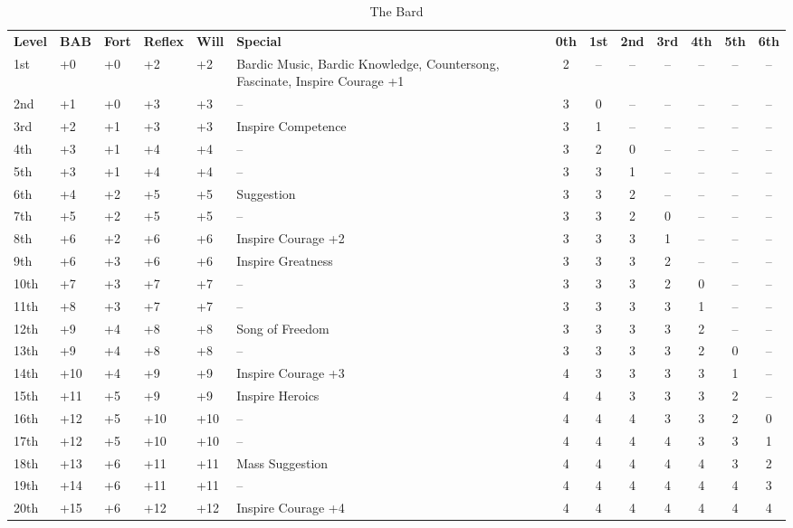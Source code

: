 \begin{table}[htb]
\caption{The Bard}
\centering
\begin{tabular}{*{5}{l}p{4.5cm}*{7}{c}}
\textbf{Level} & \textbf{BAB} & \textbf{Fort} & \textbf{Reflex} & \textbf{Will} & \textbf{Special} & \textbf{0th} & \textbf{1st} & \textbf{2nd} & \textbf{3rd} & \textbf{4th} & \textbf{5th} & \textbf{6th} \\
1st & +0 & +0 & +2 & +2 & \raggedright{}Bardic Music, Bardic Knowledge, Countersong, Fascinate, Inspire Courage +1 & 2 & -- & -- & -- & -- & -- & --\\
2nd & +1 & +0 & +3 & +3 & -- & 3 & 0 & -- & -- & -- & -- & --\\
3rd & +2 & +1 & +3 & +3 & Inspire Competence & 3 & 1 & -- & -- & -- & -- & --\\
4th & +3 & +1 & +4 & +4 & -- & 3 & 2 & 0 & -- & -- & -- & --\\
5th & +3 & +1 & +4 & +4 & -- & 3 & 3 & 1 & -- & -- & -- & --\\
6th & +4 & +2 & +5 & +5 & Suggestion & 3 & 3 & 2 & -- & -- & -- & --\\
7th & +5 & +2 & +5 & +5 & -- & 3 & 3 & 2 & 0 & -- & -- & --\\
8th & +6 & +2 & +6 & +6 & Inspire Courage +2 & 3 & 3 & 3 & 1 & -- & -- & --\\
9th & +6 & +3 & +6 & +6 & Inspire Greatness & 3 & 3 & 3 & 2 & -- & -- & --\\
10th & +7 & +3 & +7 & +7 & -- & 3 & 3 & 3 & 2 & 0 & -- & --\\
11th & +8 & +3 & +7 & +7 & -- & 3 & 3 & 3 & 3 & 1 & -- & --\\
12th & +9 & +4 & +8 & +8 & Song of Freedom & 3 & 3 & 3 & 3 & 2 & -- & --\\
13th & +9 & +4 & +8 & +8 & -- & 3 & 3 & 3 & 3 & 2 & 0 & --\\
14th & +10 & +4 & +9 & +9 & Inspire Courage +3 & 4 & 3 & 3 & 3 & 3 & 1 & --\\
15th & +11 & +5 & +9 & +9 & Inspire Heroics & 4 & 4 & 3 & 3 & 3 & 2 & --\\
16th & +12 & +5 & +10 & +10 & -- & 4 & 4 & 4 & 3 & 3 & 2 & 0\\
17th & +12 & +5 & +10 & +10 & -- & 4 & 4 & 4 & 4 & 3 & 3 & 1\\
18th & +13 & +6 & +11 & +11 & Mass Suggestion & 4 & 4 & 4 & 4 & 4 & 3 & 2\\
19th & +14 & +6 & +11 & +11 & -- & 4 & 4 & 4 & 4 & 4 & 4 & 3\\
20th & +15 & +6 & +12 & +12 & Inspire Courage +4 & 4 & 4 & 4 & 4 & 4 & 4 & 4\\
\end{tabular}
\end{table}

